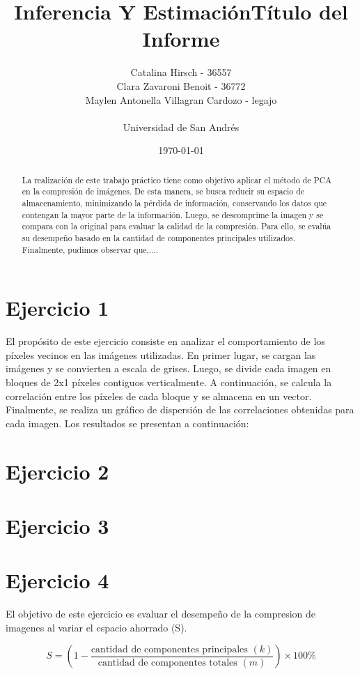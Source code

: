 \documentclass[a4paper,12pt]{article}
\title{Inferencia Y Estimación}
\title{Título del Informe}
\author{Catalina Hirsch - 36557 \\ Clara Zavaroni Benoit - 36772 \\ Maylen Antonella Villagran Cardozo - legajo \\ \\ Universidad de San Andrés}
\date{\today}
\begin{document}
\maketitle

\begin{abstract}
La realización de este trabajo práctico tiene como objetivo aplicar el método de 
PCA en la compresión de imágenes. De esta manera, se busca reducir su espacio de almacenamiento,
minimizando la pérdida de información, conservando los datos que contengan la mayor parte de la información.
Luego, se descomprime la imagen y se compara con la original para evaluar la calidad de la compresión. 
Para ello, se evalúa su desempeño basado en la cantidad de componentes principales utilizados.
Finalmente, pudimos observar que,....
\end{abstract}

\section{Ejercicio 1}
El propósito de este ejercicio consiste en analizar el comportamiento de los píxeles vecinos en las imágenes utilizadas.
En primer lugar, se cargan las imágenes y se convierten a escala de grises. Luego, se divide cada imagen en bloques de 2x1 píxeles
contiguos verticalmente. A continuación, se calcula la correlación entre los píxeles de cada bloque y se almacena en un vector.
Finalmente, se realiza un gráfico de dispersión de las correlaciones obtenidas para cada imagen.
Los resultados se presentan a continuación:

\section {Ejercicio 2}

\section {Ejercicio 3}


\section{Ejercicio 4}
El objetivo de este ejercicio es evaluar el desempeño de la compresion de imagenes al variar el espacio ahorrado (S). 

\begin{equation}
S = \left( 1 - \frac{\text{cantidad de componentes principales } (k)}{\text{cantidad de componentes totales } (m)} \right) \times 100 \%
\end{equation}
\end{document}
